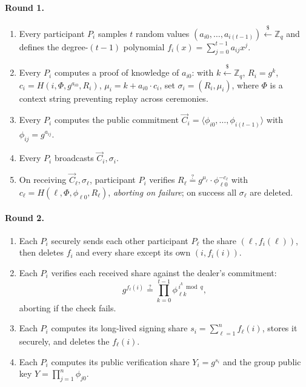 \documentclass[11pt,a4paper]{article}
\theoremstyle{definition}
\newcommand{\Z}{\mathbb{Z}}
\begin{document}
\paragraph{Round 1.}
\begin{enumerate}
\item Every participant $P_i$ samples $t$ random values
  $(a_{i0}, \dots, a_{i(t-1)}) \xleftarrow{\$} \Z_q$ and defines the
  degree-$(t-1)$ polynomial $f_i(x) = \sum_{j=0}^{t-1} a_{ij} x^j$.
\item Every $P_i$ computes a proof of knowledge of $a_{i0}$: with
  $k \xleftarrow{\$} \Z_q$, $R_i = g^k$,
  $c_i = H(i, \Phi, g^{a_{i0}}, R_i)$,
  $\mu_i = k + a_{i0} \cdot c_i$, set $\sigma_i = (R_i, \mu_i)$, where
  $\Phi$ is a context string preventing replay across ceremonies.
\item Every $P_i$ computes the public commitment
  $\vec{C}_i = \langle \phi_{i0}, \dots, \phi_{i(t-1)} \rangle$ with
  $\phi_{ij} = g^{a_{ij}}$.
\item Every $P_i$ broadcasts $\vec{C}_i, \sigma_i$.
\item On receiving $\vec{C}_\ell, \sigma_\ell$, participant $P_i$ verifies
  $R_\ell \stackrel{?}{=} g^{\mu_\ell} \cdot \phi_{\ell 0}^{-c_\ell}$ with
  $c_\ell = H(\ell, \Phi, \phi_{\ell 0}, R_\ell)$, \emph{aborting on
  failure}; on success all $\sigma_\ell$ are deleted.
\end{enumerate}

\paragraph{Round 2.}
\begin{enumerate}
\item Each $P_i$ securely sends each other participant $P_\ell$ the share
  $(\ell, f_i(\ell))$, then deletes $f_i$ and every share except its own
  $(i, f_i(i))$.
\item Each $P_i$ verifies each received share against the dealer's
  commitment:
  \[
  g^{f_\ell(i)} \stackrel{?}{=} \prod_{k=0}^{t-1} \phi_{\ell k}^{\,i^k
  \bmod q},
  \]
  aborting if the check fails.
\item Each $P_i$ computes its long-lived signing share
  $s_i = \sum_{\ell=1}^{n} f_\ell(i)$, stores it securely, and deletes the
  $f_\ell(i)$.
\item Each $P_i$ computes its public verification share $Y_i = g^{s_i}$
  and the group public key $Y = \prod_{j=1}^{n} \phi_{j0}$.
\end{enumerate}
\end{document}
